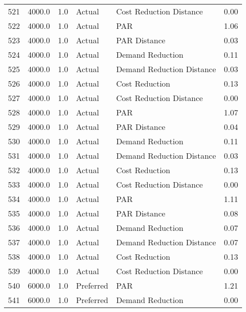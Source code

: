 \begin{longtable}{lrrllr}
521  &       4000.0 &     1.0 &         Actual &    Cost Reduction Distance &   0.00 \\
522  &       4000.0 &     1.0 &         Actual &                        PAR &   1.06 \\
523  &       4000.0 &     1.0 &         Actual &               PAR Distance &   0.03 \\
524  &       4000.0 &     1.0 &         Actual &           Demand Reduction &   0.11 \\
525  &       4000.0 &     1.0 &         Actual &  Demand Reduction Distance &   0.03 \\
526  &       4000.0 &     1.0 &         Actual &             Cost Reduction &   0.13 \\
527  &       4000.0 &     1.0 &         Actual &    Cost Reduction Distance &   0.00 \\
528  &       4000.0 &     1.0 &         Actual &                        PAR &   1.07 \\
529  &       4000.0 &     1.0 &         Actual &               PAR Distance &   0.04 \\
530  &       4000.0 &     1.0 &         Actual &           Demand Reduction &   0.11 \\
531  &       4000.0 &     1.0 &         Actual &  Demand Reduction Distance &   0.03 \\
532  &       4000.0 &     1.0 &         Actual &             Cost Reduction &   0.13 \\
533  &       4000.0 &     1.0 &         Actual &    Cost Reduction Distance &   0.00 \\
534  &       4000.0 &     1.0 &         Actual &                        PAR &   1.11 \\
535  &       4000.0 &     1.0 &         Actual &               PAR Distance &   0.08 \\
536  &       4000.0 &     1.0 &         Actual &           Demand Reduction &   0.07 \\
537  &       4000.0 &     1.0 &         Actual &  Demand Reduction Distance &   0.07 \\
538  &       4000.0 &     1.0 &         Actual &             Cost Reduction &   0.13 \\
539  &       4000.0 &     1.0 &         Actual &    Cost Reduction Distance &   0.00 \\
540  &       6000.0 &     1.0 &      Preferred &                        PAR &   1.21 \\
541  &       6000.0 &     1.0 &      Preferred &           Demand Reduction &   0.00 \\

\end{longtable}

